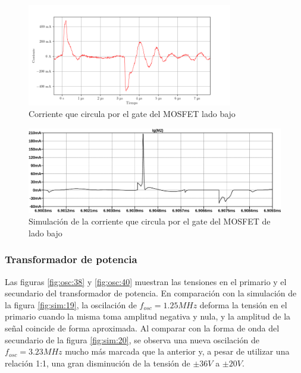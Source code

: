 \begin{figure}[H]
    \centering
    \includegraphics[width=0.8\textwidth]{images/capturas-osciloscopio/17-11-2022/17.png}
    \caption{Corriente que circula por el gate del MOSFET lado bajo}
    \label{fig:osc:17}
\end{figure}

\begin{figure}[H]
    \centering
    \includegraphics[width=\textwidth]{images/sim/9.pdf}
    \caption{Simulación de la corriente que circula por el gate del MOSFET de lado bajo}
    \label{fig:sim:9}
\end{figure}

\subsubsection{Transformador de potencia}

Las figuras \ref{fig:osc:38} y \ref{fig:osc:40} muestran las tensiones en el primario y el secundario del transformador de potencia. 
En comparación con la simulación de la figura \ref{fig:sim:19}, la oscilación de $f_{osc}=1.25MHz$ deforma la tensión en el primario cuando la misma toma amplitud negativa y nula, y la amplitud de la señal coincide de forma aproximada.
Al comparar con la forma de onda del secundario de la figura \ref{fig:sim:20}, se observa una nueva oscilación de $f_{osc}=3.23MHz$ mucho más marcada que la anterior y, a pesar de utilizar una relación 1:1, una gran disminución de la tensión de $\pm36V$ a $\pm20V$. 

